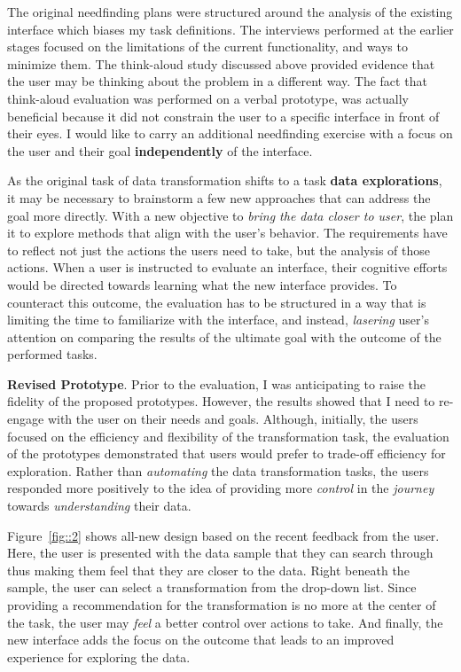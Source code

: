 \documentclass[12pt,letterpaper]{article}
\begin{document}
The original needfinding plans were structured around the analysis of the existing interface which biases my task definitions. The interviews performed at the earlier stages focused on the limitations of the current functionality, and ways to minimize them. The think-aloud study discussed above provided evidence that the user may be thinking about the problem in a different way. The fact that think-aloud evaluation was performed on a verbal prototype, was actually beneficial because it did not constrain the user to a specific interface in front of their eyes. I would like to carry an additional needfinding exercise with a focus on the user and their goal \textbf{independently} of the interface.  


As the original task of data transformation shifts to a task \textbf{data explorations}, it may be necessary to brainstorm a few new approaches that can address the goal more directly. With a new objective to \textit{bring the data closer to user}, the plan it to explore methods that align with the user's behavior. The requirements have to reflect not just the actions the users need to take, but the analysis of those actions. When a user is instructed to evaluate an interface, their cognitive efforts would be directed towards learning what the new interface provides. To counteract this outcome, the evaluation has to be structured in a way that is limiting the time to familiarize with the interface, and instead, \textit{lasering} user's attention on comparing the results of the ultimate goal with the outcome of the performed tasks.  

\textbf{Revised Prototype}. Prior to the evaluation, I was anticipating to raise the fidelity of the proposed prototypes. However, the results showed that I need to re-engage with the user on their needs and goals. Although, initially, the users focused on the efficiency and flexibility of the transformation task, the evaluation of the prototypes demonstrated that users would prefer to trade-off efficiency for exploration. Rather than \textit{automating} the data transformation tasks, the users responded more positively to the idea of providing more \textit{control} in the \textit{journey} towards \textit{understanding} their data. 

Figure~\ref{fig::2} shows all-new design based on the recent feedback from the user. Here, the user is presented with the data sample that they can search through thus making them feel that they are closer to the data. Right beneath the sample, the user can select a transformation from the drop-down list. Since providing a recommendation for the transformation is no more at the center of the task, the user may \textit{feel} a better control over actions to take. And finally, the new interface adds the focus on the outcome that leads to an improved experience for exploring the data. 
\end{document}
